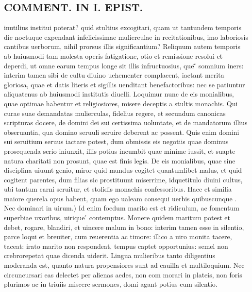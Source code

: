 \documentclass{article}
\begin{document}
\begin{pages}
\section*{COMMENT. IN I. EPIST. }
\marginpar{[ p.488 ]}\pstart inutilius institui poterat? quid stultius excogitari, quam ut tantundem temporis die noctuque  expendant infelicissimae muliereulae in recitationibus, imo laboriosis cantibus uerborum, nihil prorsus illis significantium? Reliquum autem temporis ab huiusmodi tam molesta operis fatigatione, otio et remissione resolui et deperdi, ut omne earum tempus longe sit illis infructuosius, que ̃ somnium iners: interim tamen sibi de cultu diuino uehementer complacent, iactant merita gloriosa, quae et datis literis et sigillis uenditant benefactoribus: nec se patiuntur aliquatenus ab huiusmodi institutis diuelli. Loquimur nunc de eis monialibus, quae optimae habentur et religiosiores, misere deceptis a stultis monachis. Qui curae suae demandatas mulierculas, fidelius regere, et secundum canonicas scripturas docere, de domini dei sui certissima uoluntate, et de mandatorum illius obseruantia, qua domino seruuli seruire deberent ac possent. Quis enim domini sui seruitium seruus iactare potest, dum obmissis eis negotiis quae dominus prosequenda serio iniunxit, illis potius incumbit quae minime iussit, et suapte natura charitati non prosunt, quae est finis legis. De eis monialibus, quae sine disciplina uiuunt genio, miror quid mundus cogitet quantumlibet malus, et quid cogitent parentes, dum filias sic prostituunt miserrime, idquetitulo diuini cultus, ubi tantum carni seruitur, et stolidis monachis confessoribus. Haec et similia maiore querela opus habent, quam ego ualeam consequi uerbis quibuscunque . Nec dominari in uirum.) Id enim foedum marito est et ridiculum, ac fomentum superbiae uxoribus, uirique ́ contemptus. Monere quidem maritum potest et debet, rogare, blandiri, et uincere malum in bono: interim tamen esse in silentio, parce loqui et breuiter, cum reuerentia ac timore: illico a uiro monita tacere, taceat: irato marito non respondeat, tempus captet opportunius: semel non crebrorepetat quae dicenda uiderit. Lingua mulieribus tanto diligentius moderanda est, quanto natura propensiores sunt ad cauilla et multiloquium. Nec circuncursari eas delectet per alienas aedes, non com morari in plateis, non foris plurimos ac in triuiis miscere sermones, domi agant potius cum silentio.  \pend
{}
{}

\end{pages}
\end{document}
